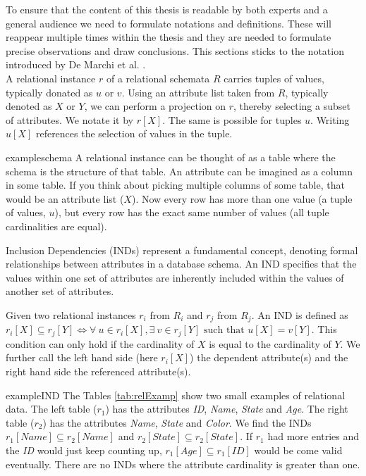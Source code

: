 To ensure that the content of this thesis is readable by both experts and a general audience we need to formulate notations and definitions. These will reappear multiple times within the thesis and they are needed to formulate precise observations and draw conclusions. This sections sticks to the notation introduced by De Marchi et al. \cite{marchi2009unary}. \\

\noindent A relational instance $r$ of a relational schemata $R$ carries tuples of values, typically donated as $u$ or $v$. Using an attribute list taken from $R$, typically denoted as $X$ or $Y$, we can perform a projection on $r$, thereby selecting a subset of attributes. We notate it by $r[X]$. The same is possible for tuples $u$. Writing $u[X]$ references the selection of values in the tuple. \\

\begin{restatable}{example}{schema}\label{exmp:schema}
A relational instance can be thought of as a table where the schema is the structure of that table. An attribute can be imagined as a column in some table. If you think about picking multiple columns of some table, that would be an attribute list ($X$). Now every row has more than one value (a tuple of values, $u$), but every row has the exact same number of values (all tuple cardinalities are equal).
\end{restatable}

\noindent Inclusion Dependencies (INDs) represent a fundamental concept, denoting formal relationships between attributes in a database schema. An IND specifies that the values within one set of attributes are inherently included within the values of another set of attributes.

\begin{definition}\label{def:inds}
    Given two relational instances $r_i$ from $R_i$ and $r_j$ from $R_j$. An IND is defined as $r_i[X] \subseteq r_j[Y] \iff \forall \: u \in r_i[X], \exists \: v \in r_j[Y] \text{ such that } u[X] = v[Y]$. This condition can only hold if the cardinality of $X$ is equal to the cardinality of $Y$. We further call the left hand side (here $r_i[X]$) the dependent attribute(s) and the right hand side the referenced attribute(s).
\end{definition}

\begin{restatable}{example}{IND}\label{exmp:IND}
    The Tables \ref{tab:relExamp} show two small examples of relational data. The left table ($r_1$) has the attributes \textit{ID}, \textit{Name}, \textit{State} and \textit{Age}. The right table ($r_2$) has the attributes \textit{Name}, \textit{State} and \textit{Color}. We find the INDs $r_1[Name] \subseteq r_2[Name]$ and $r_2[State] \subseteq r_2[State]$. If $r_1$ had more entries and the \textit{ID} would just keep counting up, $r_1[Age] \subseteq r_1[ID]$ would be come valid eventually. There are no INDs where the attribute cardinality is greater than one.
\end{restatable}

